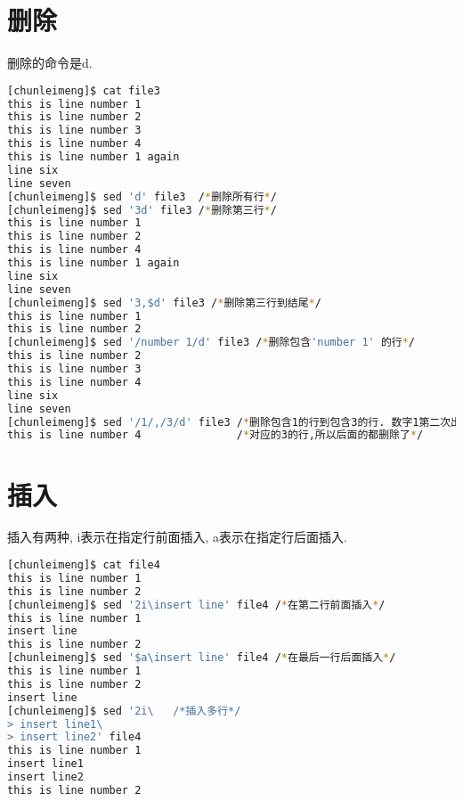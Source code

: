 \documentclass{article}
\begin{document}
\section{删除}
删除的命令是d. \par
\begin{lstlisting}[language=bash, caption={Delete}]
[chunleimeng]$ cat file3
this is line number 1
this is line number 2
this is line number 3
this is line number 4
this is line number 1 again
line six
line seven
[chunleimeng]$ sed 'd' file3  /*删除所有行*/
[chunleimeng]$ sed '3d' file3 /*删除第三行*/
this is line number 1
this is line number 2
this is line number 4
this is line number 1 again
line six
line seven
[chunleimeng]$ sed '3,$d' file3 /*删除第三行到结尾*/
this is line number 1
this is line number 2
[chunleimeng]$ sed '/number 1/d' file3 /*删除包含'number 1' 的行*/
this is line number 2
this is line number 3
this is line number 4
line six
line seven
[chunleimeng]$ sed '/1/,/3/d' file3 /*删除包含1的行到包含3的行. 数字1第二次出现的时候没有*/
this is line number 4               /*对应的3的行,所以后面的都删除了*/
\end{lstlisting}
\section{插入}
插入有两种, i表示在指定行前面插入, a表示在指定行后面插入. \par
\begin{lstlisting}[language=bash, caption={Insert}]
[chunleimeng]$ cat file4 
this is line number 1
this is line number 2
[chunleimeng]$ sed '2i\insert line' file4 /*在第二行前面插入*/
this is line number 1
insert line
this is line number 2
[chunleimeng]$ sed '$a\insert line' file4 /*在最后一行后面插入*/
this is line number 1
this is line number 2
insert line
[chunleimeng]$ sed '2i\   /*插入多行*/
> insert line1\
> insert line2' file4
this is line number 1
insert line1
insert line2
this is line number 2
\end{lstlisting}
\end{document}
